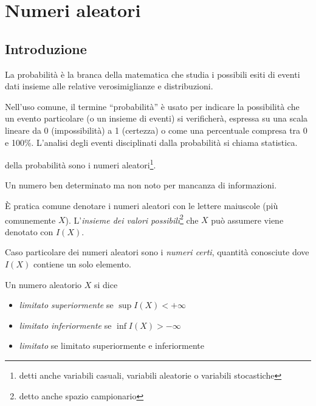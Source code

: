 %
%
%
%
\chapter{Numeri aleatori}
\section{Introduzione}
La probabilità è la branca della matematica che studia i possibili esiti di eventi dati insieme alle relative verosimiglianze e distribuzioni.

Nell'uso comune, il termine ``probabilità'' è usato per indicare la possibilità che un evento particolare (o un insieme di eventi) si verificherà, espressa su una scala lineare da 0 (impossibilità) a 1 (certezza) o come una percentuale compresa tra 0 e 100\%.
L'analisi degli eventi disciplinati dalla probabilità si chiama statistica.

 della probabilità sono i numeri aleatori\footnote{detti anche variabili casuali, variabili aleatorie o variabili stocastiche}.

\begin{definition}
  Un numero ben determinato ma non noto per mancanza di informazioni.
\end{definition}
È pratica comune denotare i numeri aleatori con le lettere maiuscole (più comunemente $X$).
L'\emph{insieme dei valori possibili}\footnote{detto anche spazio campionario} che $X$ può assumere viene denotato con $I(X)$.

Caso particolare dei numeri aleatori sono i \emph{numeri certi}, quantità conosciute dove $I(X)$ contiene un solo elemento.

\begin{definition}
  Un numero aleatorio $X$ si dice
  \begin{itemize}
  \item \emph{limitato superiormente} se \( \sup I(X) < + \infty \)
  \item \emph{limitato inferiormente} se \( \inf I(X) > - \infty \)
  \item \emph{limitato} se limitato superiormente e inferiormente
  \end{itemize}
\end{definition}

